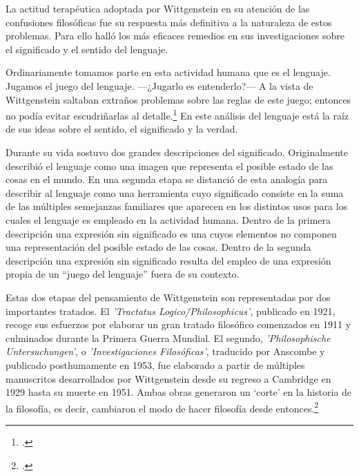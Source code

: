 La actitud terapéutica adoptada por Wittgenstein en su atención de las
confusiones filosóficas fue su respuesta más definitiva a la naturaleza de estos
problemas. Para ello halló los más eficaces remedios en sus investigaciones
sobre el significado y el sentido del lenguaje.

Ordinariamente tomamos parte en esta actividad humana que es el lenguaje.
Jugamos el juego del lenguaje. ---¿Jugarlo es entenderlo?--- A la vista de
Wittgenstein saltaban extraños problemas sobre las reglas de este juego;
entonces no podía evitar escudriñarlas al
detalle.\footcite[cf.~][loc.7099]{monk} En este análisis del lenguaje está la
raíz de sus ideas sobre el sentido, el significado y la verdad.

Durante su vida sostuvo dos grandes descripciones del significado. Originalmente
describió el lenguaje como una imagen que representa el posible estado de las
cosas en el mundo. En una segunda etapa se distanció de esta analogía para
describir al lenguaje como una herramienta cuyo significado consiste en la suma
de las múltiples semejanzas familiares que aparecen en los distintos usos para
los cuales el lenguaje es empleado en la actividad humana. Dentro de la primera
descripción una expresión sin significado es una cuyos elementos no componen una
representación del posible estado de las cosas. Dentro de la segunda descripción
una expresión sin significado resulta del empleo de una expresión propia de un
``juego del lenguaje'' fuera de su contexto.


Estas dos etapas del pensamiento de Wittgenstein son representadas por dos
importantes tratados. El \emph{'Tractatus Logico\=/Philosophicus'}, publicado en
1921, recoge sus esfuerzos por elaborar un gran tratado filosófico comenzados en
1911 y culminados durante la Primera Guerra Mundial. El segundo,
\emph{'Philosophische Untersuchungen'}, o \emph{'Investigaciones Filosóficas'},
traducido por Anscombe y publicado posthumamente en 1953, fue elaborado a partir
de múltiples manuscritos desarrollados por Wittgenstein desde su regreso a
Cambridge en 1929 hasta su muerte en 1951. Ambas obras generaron un `corte' en
la historia de la filosofía, es decir, cambiaron el modo de hacer filosofía
desde entonces.\footcite[cf.~][p.~181]{twocuts}

